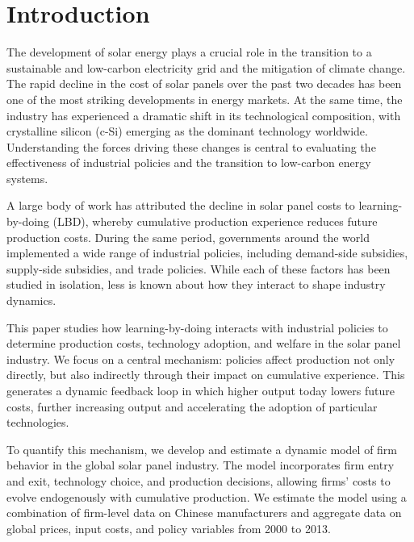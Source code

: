 \documentclass[12pt]{article}
\begin{document}

\clearpage
\setcounter{page}{1}

\section{Introduction}

The development of solar energy plays a crucial role in the transition to a sustainable and low-carbon electricity grid and the mitigation of climate change. The rapid decline in the cost of solar panels over the past two decades has been one of the most striking developments in energy markets. At the same time, the industry has experienced a dramatic shift in its technological composition, with crystalline silicon (c-Si) emerging as the dominant technology worldwide. Understanding the forces driving these changes is central to evaluating the effectiveness of industrial policies and the transition to low-carbon energy systems.

A large body of work has attributed the decline in solar panel costs to learning-by-doing (LBD), whereby cumulative production experience reduces future production costs. During the same period, governments around the world implemented a wide range of industrial policies, including demand-side subsidies, supply-side subsidies, and trade policies. %
While each of these factors has been studied in isolation, less is known about how they interact to shape industry dynamics.

This paper studies how learning-by-doing interacts with industrial policies to determine production costs, technology adoption, and welfare in the solar panel industry. We focus on a central mechanism: policies affect production not only directly, but also indirectly through their impact on cumulative experience. This generates a dynamic feedback loop in which higher output today lowers future costs, further increasing output and accelerating the adoption of particular technologies.

To quantify this mechanism, we develop and estimate a dynamic model of firm behavior in the global solar panel industry. The model incorporates firm entry and exit, technology choice, and production decisions, allowing firms’ costs to evolve endogenously with cumulative production. We estimate the model using a combination of firm-level data on Chinese manufacturers and aggregate data on global prices, input costs, and policy variables from 2000 to 2013.
\end{document}
